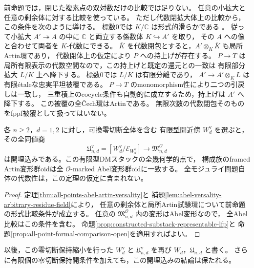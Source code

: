 \begin{remark}[剰余体の拡大と有限降下]
前命題では，閉じた複素点の双対数だけの比較では足りない。
任意の小拡大と任意の剰余体に対する比較を使っている。
ただし代数閉拡大体上の比較から，この条件を次のように導ける。
標数0では $K/\mathbb C$ は形式的滑らかである
\cite[Tag~0321]{StacksProject}。
従って小拡大 $A'\twoheadrightarrow A$ の中に
$\mathbb C$ と両立する係数体 $K\hookrightarrow A'$ を取り，
その $A$ への像と合わせて両者を $K$-代数にできる。
$\overline K$ を代数閉包とすると，$A'\otimes_K\overline K$ も局所Artin環であり，
代数閉体上の仮定により $P$ への持上げが存在する。
$P\to T$ は局所有限表示の代数空間なので，この持上げと既定の還元との一致は
有限部分拡大 $L/K$ 上へ降下する。
標数0では $L/K$ は有限分離であり，
$A'\to A'\otimes_K L$ は有限\'{e}taleな忠実平坦被覆である。
$P\to T$ のmonomorphism性により二つの引戻しは一致し，
三重積上のcocycle条件も自動的に成立するため，持上げは $A'$ へ降下する。
この被覆の全\v Cech環はArtinである。
無限次数の代数閉包そのものをfppf被覆として扱ってはいない。
\end{remark}

\begin{theorem}[全モジュライ内の零切断を含む開部分スタック]
\label{thm:zero-neighborhood-open-full-moduli}
各 $n\ge2$，$d=1,2$ に対し，可換零切断全体を含む
有限型開近傍 $W_d^{\mathrm v}$ を選ぶと，その全同値商
\[
 \mathfrak U_{n,d}^{\mathrm v}
 =[W_d^{\mathrm v}/\mathcal E_{W_d^{\mathrm v}}]
 \longrightarrow\mathfrak M^{\mathcal O}_{n,d}
\]
は開埋込みである。この有限型DMスタックの全幾何学的点で，
構成族のframed Artin変形群oidは全 $\mathcal O$-marked Abel変形群oidに一致する。
全モジュライ問題自体の代数性は，この定理の仮定に含まれない。
\end{theorem}
\begin{proof}
定理\ref{thm:all-points-abel-artin-versality}と
補題\ref{lem:abel-versality-arbitrary-residue-field}により，
任意の剰余体と局所Artin試験環について前命題の形式比較条件が成立する。
任意の $\mathfrak M^{\mathcal O}_{n,d}$ 内の変形はAbel変形なので，
全Abel比較はこの条件を含む。
命題\ref{prop:constructed-substack-representable-lfp}と
命題\ref{prop:all-point-formal-comparison-open}を適用すればよい。
\end{proof}

以後，この零切断保持縮小を行った $W_d^{\mathrm v}$ と
$\mathfrak U_{n,d}^{\mathrm v}$ を再び $W_d$，$\mathfrak U_{n,d}$ と書く。
さらに有限個の零切断保持開条件を加えても，この開埋込みの結論は保たれる。

